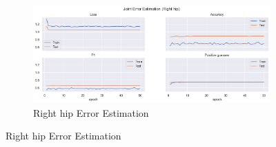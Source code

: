 \begin{figure}[!htbp]
\begin{subfigure}[b]{0.47\linewidth}
  \end{subfigure}
  \hfill
  \begin{subfigure}[b]{0.47\linewidth}
      \centering
      \includegraphics[width=\textwidth]{figures/Results/v1/jt/Right hip_ErrorEstimation.png}
      \caption{Right hip Error Estimation}
      \label{fig:v1_rihi_jt_ee}
  \end{subfigure}
\end{figure}



